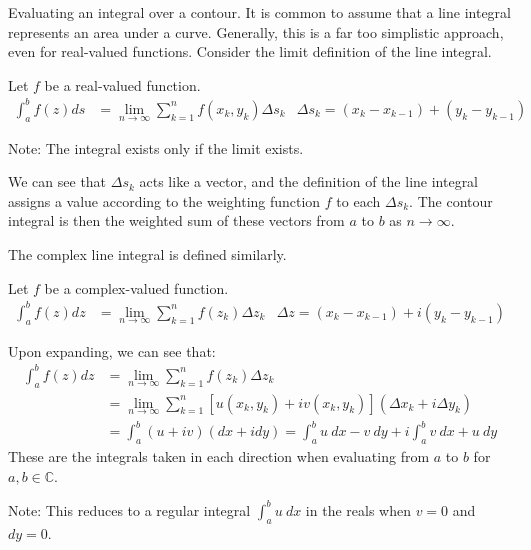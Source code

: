 \documentclass[12pt, english]{book}
\begin{document}
	Evaluating an integral over a contour. It is common to assume that a line integral represents an area under a curve. Generally, this is a far too simplistic approach, even for real-valued functions. Consider the limit definition of the line integral.
	
	\begin{definition}
		\label{Line integral Definition - Complex}
		Let \(f\) be a real-valued function.
		\begin{align*}
			\int_{a}^{b} f(z) ds
			&= \lim_{n \rightarrow \infty} \sum_{k=1}^{n} f(x_k, y_k) \Delta s_k
				&\Delta s_k = (x_k - x_{k-1}) + (y_k - y_{k-1})
		\end{align*}
	\end{definition}

	Note: The integral exists only if the limit exists. 
	
	We can see that \(\Delta s_k\) acts like a vector, and the definition of the line integral assigns a value according to the weighting function \(f\) to each \(\Delta s_k\). The contour integral is then the weighted sum of these vectors from \(a\) to \(b\) as \(n \rightarrow \infty\).
	
	The complex line integral is defined similarly.
	
	\begin{definition}
		Let \(f\) be a complex-valued function.
		\begin{align*}
			\int_{a}^{b} f(z) dz 
			&= \lim_{n \rightarrow \infty} \sum_{k=1}^{n} f(z_k) \Delta z_k 
				& \Delta z = (x_k - x_{k-1}) + i(y_k - y_{k-1})
		\end{align*}
	\end{definition}

	Upon expanding, we can see that:
	\begin{align*}
		\int_{a}^{b} f(z) dz 
		&= \lim_{n \rightarrow \infty} \sum_{k=1}^{n} f(z_k) \Delta z_k  \\
		&= \lim_{n \rightarrow \infty} \sum_{k=1}^{n} [u(x_k, y_k) + iv(x_k, y_k)](\Delta x_k + i \Delta y_k) \\
		&= \int_{a}^{b} (u + iv)(dx + i dy) = \int_{a}^{b} u \ dx - v \ dy + i\int_{a}^{b} v \ dx + u \ dy
	\end{align*}
	These are the integrals taken in each direction when evaluating from \(a\) to \(b\) for \(a,b \in \mathbb{C}\).
	
	Note: This reduces to a regular integral \(\int_{a}^{b} u \ dx\) in the reals when \(v = 0\) and \(dy = 0\).
\end{document}
